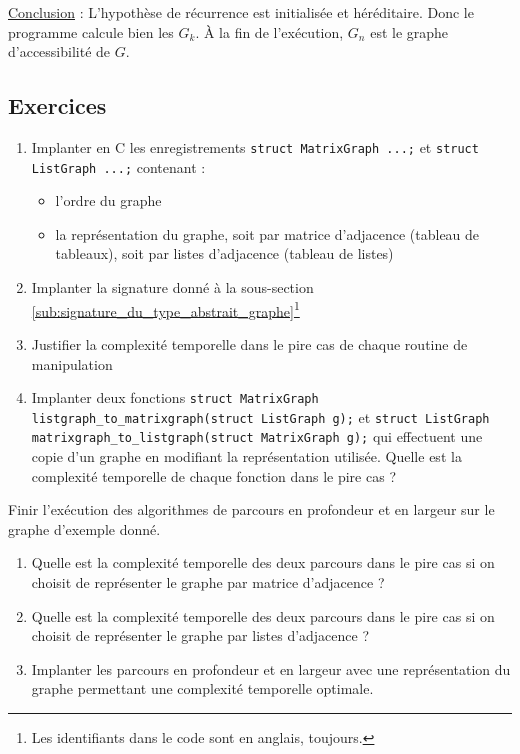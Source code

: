\documentclass[../../../main.tex]{subfiles}
\begin{document}
\underline{Conclusion} : L'hypothèse de récurrence est initialisée et héréditaire. Donc le programme calcule bien les $G_k$. À la fin de l'exécution, $G_n$ est le graphe d'accessibilité de $G$.
\subsection{Exercices}
\begin{enumerate}
	\item Implanter en C les enregistrements \texttt{struct MatrixGraph {...};} et \texttt{struct ListGraph {...};} contenant :
	\begin{itemize}
		\item l'ordre du graphe
		\item la représentation du graphe, soit par matrice d'adjacence (tableau de tableaux), soit par listes d'adjacence (tableau de listes)
	\end{itemize}
	\item Implanter la signature donné à la sous-section \ref{sub:signature_du_type_abstrait_graphe}\footnote{Les identifiants dans le code sont en anglais, toujours.}
	\item Justifier la complexité temporelle dans le pire cas de chaque routine de manipulation
	\item Implanter deux fonctions \texttt{struct MatrixGraph listgraph_to_matrixgraph(struct ListGraph g);} et \texttt{struct ListGraph matrixgraph_to_listgraph(struct MatrixGraph g);} qui effectuent une copie d'un graphe en modifiant la représentation utilisée. Quelle est la complexité temporelle de chaque fonction dans le pire cas ?
\end{enumerate}
 Finir l'exécution des algorithmes de parcours en profondeur et en largeur sur le graphe d'exemple donné.

\begin{enumerate}
	\item Quelle est la complexité temporelle des deux parcours dans le pire cas si on choisit de représenter le graphe par matrice d'adjacence ?
	\item Quelle est la complexité temporelle des deux parcours dans le pire cas si on choisit de représenter le graphe par listes d'adjacence ?
	\item Implanter les parcours en profondeur et en largeur avec une représentation du graphe permettant une complexité temporelle optimale.
\end{enumerate}
\end{document}
